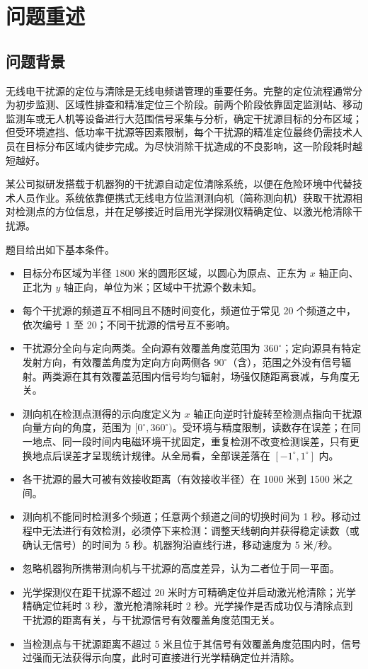 \section{问题重述}

\subsection{问题背景}

无线电干扰源的定位与清除是无线电频谱管理的重要任务。完整的定位流程通常分为初步监测、区域性排查和精准定位三个阶段。前两个阶段依靠固定监测站、移动监测车或无人机等设备进行大范围信号采集与分析，确定干扰源目标的分布区域；但受环境遮挡、低功率干扰源等因素限制，每个干扰源的精准定位最终仍需技术人员在目标分布区域内徒步完成。为尽快消除干扰造成的不良影响，这一阶段耗时越短越好。

某公司拟研发搭载于机器狗的干扰源自动定位清除系统，以便在危险环境中代替技术人员作业。系统依靠便携式无线电方位监测测向机（简称测向机）获取干扰源相对检测点的方位信息，并在足够接近时启用光学探测仪精确定位、以激光枪清除干扰源。

题目给出如下基本条件。

\begin{itemize}[label=\textbullet,leftmargin=2em]
  \item 目标分布区域为半径 1800 米的圆形区域，以圆心为原点、正东为 $x$ 轴正向、正北为 $y$ 轴正向，单位为米；区域中干扰源个数未知。
  \item 每个干扰源的频道互不相同且不随时间变化，频道位于常见 20 个频道之中，依次编号 1 至 20；不同干扰源的信号互不影响。
  \item 干扰源分全向与定向两类。全向源有效覆盖角度范围为 $360^\circ$；定向源具有特定发射方向，有效覆盖角度为定向方向两侧各 $90^\circ$（含），范围之外没有信号辐射。两类源在其有效覆盖范围内信号均匀辐射，场强仅随距离衰减，与角度无关。
  \item 测向机在检测点测得的示向度定义为 $x$ 轴正向逆时针旋转至检测点指向干扰源向量方向的角度，范围为 $[0^\circ,360^\circ)$。受环境与精度限制，读数存在误差；在同一地点、同一段时间内电磁环境干扰固定，重复检测不改变检测误差，只有更换地点后误差才呈现统计规律。从全局看，全部误差落在 $[-1^\circ,1^\circ]$ 内。
  \item 各干扰源的最大可被有效接收距离（有效接收半径）在 1000 米到 1500 米之间。
  \item 测向机不能同时检测多个频道；任意两个频道之间的切换时间为 1 秒。移动过程中无法进行有效检测，必须停下来检测：调整天线朝向并获得稳定读数（或确认无信号）的时间为 5 秒。机器狗沿直线行进，移动速度为 5 米/秒。
  \item 忽略机器狗所携带测向机与干扰源的高度差异，认为二者位于同一平面。
  \item 光学探测仪在距干扰源不超过 20 米时方可精确定位并启动激光枪清除；光学精确定位耗时 3 秒，激光枪清除耗时 2 秒。光学操作是否成功仅与清除点到干扰源的距离有关，与干扰源信号有效覆盖角度范围无关。
  \item 当检测点与干扰源距离不超过 5 米且位于其信号有效覆盖角度范围内时，信号过强而无法获得示向度，此时可直接进行光学精确定位并清除。
\end{itemize}

